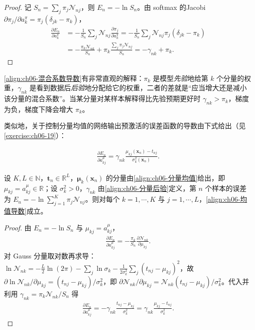 \documentclass[../../main.tex]{subfiles}
\begin{document}
\begin{proof}
记 $S_n=\sum_{j}\pi_j\mathcal{N}_{nj}$，则 $E_n=-\ln S_n$。由 softmax 的Jacobi $\partial\pi_j/\partial a_k^{\pi}=\pi_j(\delta_{jk}-\pi_k)$，
\begin{align}
\frac{\partial E_n}{\partial a_k^{\pi}}
&=-\frac{1}{S_n}\sum_{j}\mathcal{N}_{nj}\frac{\partial\pi_j}{\partial a_k^{\pi}}
=-\frac{1}{S_n}\sum_{j}\mathcal{N}_{nj}\pi_j(\delta_{jk}-\pi_k)\nonumber\\
&=-\frac{\pi_k\mathcal{N}_{nk}}{S_n}+\pi_k\frac{\sum_j\pi_j\mathcal{N}_{nj}}{S_n}
=-\gamma_{nk}+\pi_k .
\end{align}
\end{proof}

\begin{remark}\eqref{align:ch06-混合系数导数}有非常直观的解释：$\pi_k$ 是模型\emph{先验}地给第 $k$ 个分量的权重，$\gamma_{nk}$ 是看到数据后\emph{后验}地分配给它的权重，二者的差就是“应当增大还是减小该分量的混合系数”。当某分量对某样本解释得比先验预期更好时 $\gamma_{nk}>\pi_k$，梯度为负，梯度下降会增大 $\pi_k$。
\end{remark}

类似地，关于控制分量均值的网络输出预激活的误差函数的导数由下式给出（见\cref{exercise:ch06-19}）：

\begin{align}
\frac{\partial E_n}{\partial a_{kj}^{\mu}}=\gamma_{nk}\frac{\mu_{kj}(\boldsymbol{x}_n)-t_{nj}}{\sigma_k^{2}(\boldsymbol{x}_n)}.
\label{align:ch06-均值导数}
\end{align}

\begin{proposition}[分量均值预激活的导数]\label{proposition:ch06-均值导数}
设 $K,L\in\mathbb{N}$，$\boldsymbol{t}_{n}\in\mathbb{R}^{L}$，$\boldsymbol{\mu}_{k}(\boldsymbol{x}_{n})$ 的分量由\eqref{align:ch06-分量均值}给出，即 $\mu_{kj}=a_{kj}^{\mu}\in\mathbb{R}$；设 $\sigma_{k}^{2}>0$，$\gamma_{nk}$ 由\eqref{align:ch06-分量后验}定义，第 $n$ 个样本的误差为 $E_{n}=-\ln\sum_{j=1}^{K}\pi_{j}\mathcal{N}_{nj}$。则对每个 $k=1,\cdots,K$ 与 $j=1,\cdots,L$，\eqref{align:ch06-均值导数}成立。
\end{proposition}

\begin{proof}
由 $E_n=-\ln S_n$ 与 $\mu_{kj}=a_{kj}^{\mu}$，
\begin{align}
\frac{\partial E_n}{\partial a_{kj}^{\mu}}=-\frac{\pi_k}{S_n}\frac{\partial\mathcal{N}_{nk}}{\partial\mu_{kj}}.
\end{align}
对 Gauss 分量取对数再求导：$\ln\mathcal{N}_{nk}=-\frac{L}{2}\ln(2\pi)-\sum_{j}\ln\sigma_k-\frac{1}{2\sigma_k^{2}}\sum_{j}(t_{nj}-\mu_{kj})^{2}$，故 $\partial\ln\mathcal{N}_{nk}/\partial\mu_{kj}=(t_{nj}-\mu_{kj})/\sigma_k^{2}$，即 $\partial\mathcal{N}_{nk}/\partial\mu_{kj}=\mathcal{N}_{nk}(t_{nj}-\mu_{kj})/\sigma_k^{2}$。代入并利用 $\gamma_{nk}=\pi_k\mathcal{N}_{nk}/S_n$ 得
\begin{align}
\frac{\partial E_n}{\partial a_{kj}^{\mu}}
=-\gamma_{nk}\frac{t_{nj}-\mu_{kj}}{\sigma_k^{2}}
=\gamma_{nk}\frac{\mu_{kj}-t_{nj}}{\sigma_k^{2}}.
\end{align}
\end{proof}
\end{document}
